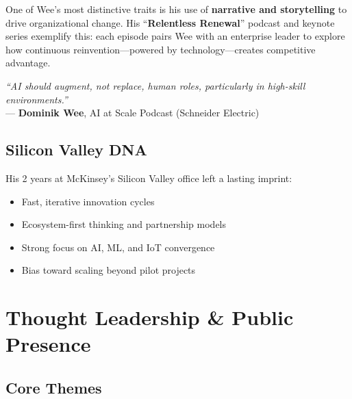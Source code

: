 \documentclass[11pt,a4paper]{article}
\begin{document}
One of Wee's most distinctive traits is his use of \textbf{narrative and storytelling} to drive organizational change. His ``\textbf{Relentless Renewal}'' podcast and keynote series exemplify this: each episode pairs Wee with an enterprise leader to explore how continuous reinvention---powered by technology---creates competitive advantage.

\begin{center}
\begin{tcolorbox}[
    colback=mslightgray,
    colframe=mslightblue,
    boxrule=0.5pt,
    arc=3pt,
    left=10pt, right=10pt, top=8pt, bottom=8pt,
    width=0.85\textwidth
]
\textit{``AI should augment, not replace, human roles, particularly in high-skill environments.''}\\[5pt]
\hfill --- \textbf{Dominik Wee}, AI at Scale Podcast (Schneider Electric)
\end{tcolorbox}
\end{center}

\subsection{Silicon Valley DNA}

His 2 years at McKinsey's Silicon Valley office left a lasting imprint:
\begin{itemize}
    \item Fast, iterative innovation cycles
    \item Ecosystem-first thinking and partnership models
    \item Strong focus on AI, ML, and IoT convergence
    \item Bias toward scaling beyond pilot projects
\end{itemize}

\newpage

\section{Thought Leadership \& Public Presence}

\subsection{Core Themes}
\end{document}
